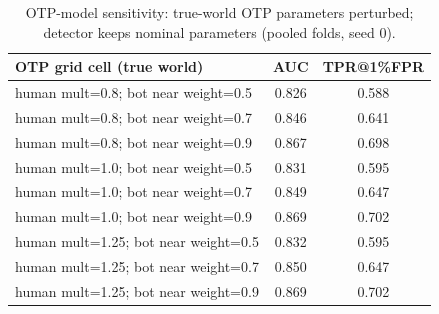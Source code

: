 \begin{table}[t]
\caption{OTP-model sensitivity: true-world OTP parameters perturbed; detector keeps nominal parameters (pooled folds, seed 0).}
\label{tab:otp}
\centering
\small
\begin{tabular}{lcc}
\toprule
OTP grid cell (true world) & AUC & TPR@1\%FPR \\
\midrule
human mult=0.8; bot near weight=0.5 & 0.826 & 0.588 \\
human mult=0.8; bot near weight=0.7 & 0.846 & 0.641 \\
human mult=0.8; bot near weight=0.9 & 0.867 & 0.698 \\
human mult=1.0; bot near weight=0.5 & 0.831 & 0.595 \\
human mult=1.0; bot near weight=0.7 & 0.849 & 0.647 \\
human mult=1.0; bot near weight=0.9 & 0.869 & 0.702 \\
human mult=1.25; bot near weight=0.5 & 0.832 & 0.595 \\
human mult=1.25; bot near weight=0.7 & 0.850 & 0.647 \\
human mult=1.25; bot near weight=0.9 & 0.869 & 0.702 \\
\bottomrule
\end{tabular}
\end{table}
